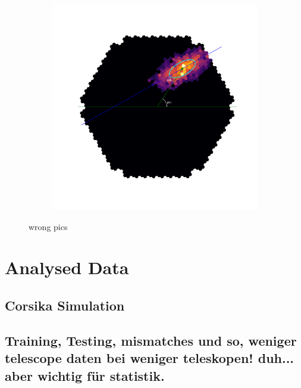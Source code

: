 \begin{figure}
\begin{subfigure}{0.3\textwidth}
        \label{fig:2}
    \end{subfigure}
    \begin{subfigure}{0.3\textwidth}
        \includegraphics[width=0.9\linewidth]{Plots/hillas_cleaned_params.pdf} 
        \label{fig:1}
    \end{subfigure}
    \caption{wrong pics}
    \label{fig:disp_magic}
\end{figure}





\section{Analysed Data}
\subsection{Corsika Simulation}
\subsection{Training, Testing, mismatches und so, weniger telescope daten bei weniger teleskopen! duh... aber wichtig für statistik.}
